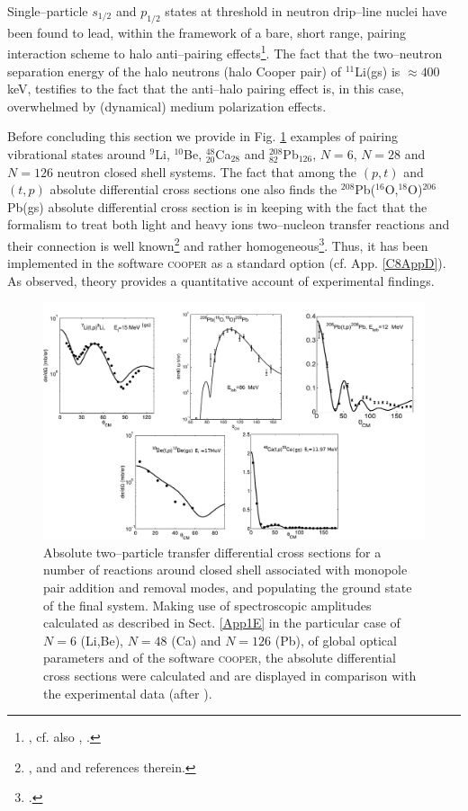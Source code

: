    
   
 Single--particle $s_{1/2}$ and $p_{1/2}$ states at threshold in neutron drip--line nuclei have been found to lead, within the framework of a bare, short range, pairing interaction scheme to halo anti--pairing effects\footnote{\citet{Bennaceur:00}, cf. also \citet{Hamamoto:03}, \citet{Hamamoto:04}.}. The fact that the two--neutron separation energy of the halo neutrons (halo Cooper pair) of $^{11}$Li(gs) is $\approx 400$keV, testifies to the fact that the anti--halo pairing effect is, in this case, overwhelmed by (dynamical) medium polarization effects.
 

 
 
 Before concluding this section we provide in Fig. \ref{fig8_2_1} examples of pairing vibrational states around $^9$Li, $^{10}$Be, $^{48}_{20}$Ca$_{28}$ and $^{208}_{82}$Pb$_{126}$, $N=6$,  $N=28$ and $N=126$ neutron closed shell systems. The fact that among the $(p,t)$ and $(t,p)$ absolute differential cross sections one also finds the $^{208}$Pb($^{16}$O,$^{18}$O)$^{206}$Pb(gs) absolute differential cross section is in keeping with the fact that the formalism to treat both light and heavy ions two--nucleon transfer reactions and their connection is well known\footnote{\cite{Broglia:04a}, \cite{Bayman:82} and  \cite{Thompson:88} and references therein.} and rather homogeneous\footnote{\cite{Potel:13b}.}. Thus, it has been implemented in the software \textsc{cooper} as a standard option (cf. App. \ref{C8AppD}). As observed, theory provides a quantitative account of experimental findings.
   \begin{figure}
   \centerline{\includegraphics*[width=12cm,angle=0]{C8/figsC8/fig8_1_5}}
   	\caption{Absolute two--particle transfer differential cross sections for a number of reactions around closed shell associated with monopole pair addition and removal modes, and populating the ground state of the final system. Making use of spectroscopic amplitudes calculated as described in Sect. \ref{App1E} in the particular case of $N=6$ (Li,Be), $N=48$ (Ca) and  $N=126$ (Pb), of global optical parameters and of the software \textsc{cooper}, the absolute differential cross sections were calculated and are displayed in comparison with the experimental data (after \cite{Potel:13}).}\label{fig8_2_1}
   \end{figure}
 
